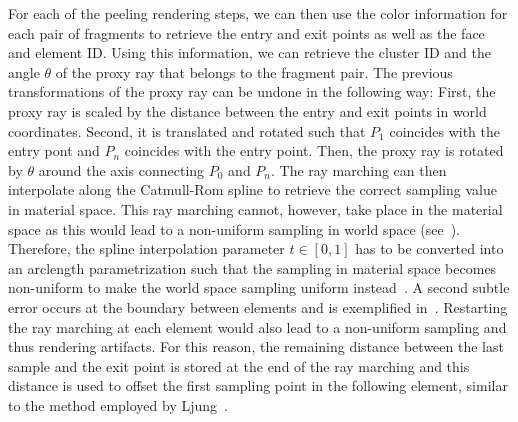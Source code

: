 For each of the peeling rendering steps, we can then use the color information for each pair of fragments to retrieve the entry and exit points as well as the face and element ID. Using this information, we can retrieve the cluster ID and the angle $\theta$ of the proxy ray that belongs to the fragment pair. The previous transformations of the proxy ray can be undone in the following way: First, the proxy ray is scaled by the distance between the entry and exit points in world coordinates. Second, it is translated and rotated such that $P_1$ coincides with the entry pont and $P_n$ coincides with the entry point. Then, the proxy ray is rotated by $\theta$ around the axis connecting $P_0$ and $P_n$. The ray marching can then interpolate along the Catmull-Rom spline to retrieve the correct sampling value in material space. This ray marching cannot, however, take place in the material space as this would lead to a non-uniform sampling in world space (see~). Therefore, the spline interpolation parameter $t \in [0,1]$ has to be converted into an arclength parametrization such that the sampling in material space becomes non-uniform to make the world space sampling uniform instead~\cite{guenter90arclength}. A second subtle error occurs at the boundary between elements and is exemplified in~. Restarting the ray marching at each element would also lead to a non-uniform sampling and thus rendering artifacts. For this reason, the remaining distance between the last sample and the exit point is stored at the end of the ray marching and this distance is used to offset the first sampling point in the following element, similar to the method employed by Ljung~\cite{ljung2006adaptive}.

